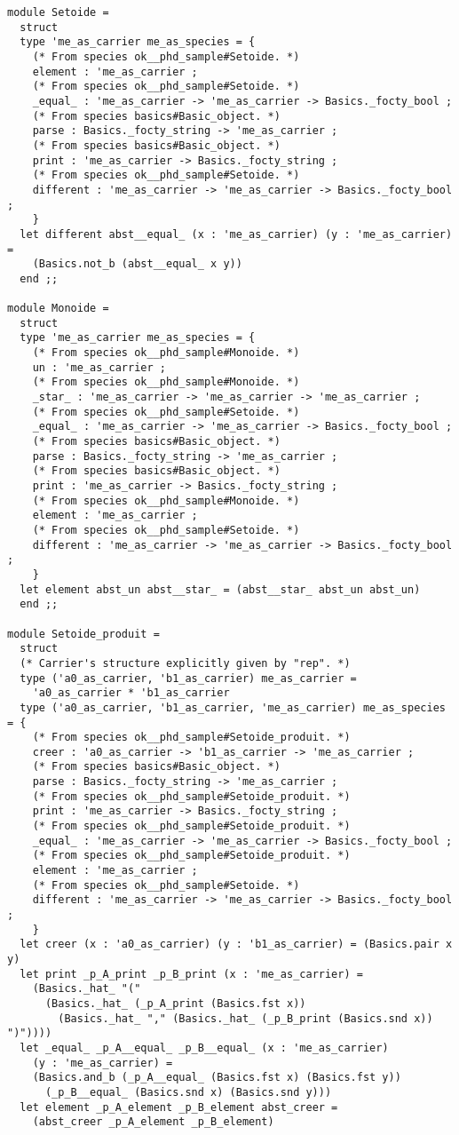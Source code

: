 {\footnotesize
\begin{lstlisting}[language=MyOCaml]
module Setoide =
  struct
  type 'me_as_carrier me_as_species = {
    (* From species ok__phd_sample#Setoide. *)
    element : 'me_as_carrier ;
    (* From species ok__phd_sample#Setoide. *)
    _equal_ : 'me_as_carrier -> 'me_as_carrier -> Basics._focty_bool ;
    (* From species basics#Basic_object. *)
    parse : Basics._focty_string -> 'me_as_carrier ;
    (* From species basics#Basic_object. *)
    print : 'me_as_carrier -> Basics._focty_string ;
    (* From species ok__phd_sample#Setoide. *)
    different : 'me_as_carrier -> 'me_as_carrier -> Basics._focty_bool ;
    }
  let different abst__equal_ (x : 'me_as_carrier) (y : 'me_as_carrier) =
    (Basics.not_b (abst__equal_ x y))
  end ;;

module Monoide =
  struct
  type 'me_as_carrier me_as_species = {
    (* From species ok__phd_sample#Monoide. *)
    un : 'me_as_carrier ;
    (* From species ok__phd_sample#Monoide. *)
    _star_ : 'me_as_carrier -> 'me_as_carrier -> 'me_as_carrier ;
    (* From species ok__phd_sample#Setoide. *)
    _equal_ : 'me_as_carrier -> 'me_as_carrier -> Basics._focty_bool ;
    (* From species basics#Basic_object. *)
    parse : Basics._focty_string -> 'me_as_carrier ;
    (* From species basics#Basic_object. *)
    print : 'me_as_carrier -> Basics._focty_string ;
    (* From species ok__phd_sample#Monoide. *)
    element : 'me_as_carrier ;
    (* From species ok__phd_sample#Setoide. *)
    different : 'me_as_carrier -> 'me_as_carrier -> Basics._focty_bool ;
    }
  let element abst_un abst__star_ = (abst__star_ abst_un abst_un)
  end ;;

module Setoide_produit =
  struct
  (* Carrier's structure explicitly given by "rep". *)
  type ('a0_as_carrier, 'b1_as_carrier) me_as_carrier =
    'a0_as_carrier * 'b1_as_carrier
  type ('a0_as_carrier, 'b1_as_carrier, 'me_as_carrier) me_as_species = {
    (* From species ok__phd_sample#Setoide_produit. *)
    creer : 'a0_as_carrier -> 'b1_as_carrier -> 'me_as_carrier ;
    (* From species basics#Basic_object. *)
    parse : Basics._focty_string -> 'me_as_carrier ;
    (* From species ok__phd_sample#Setoide_produit. *)
    print : 'me_as_carrier -> Basics._focty_string ;
    (* From species ok__phd_sample#Setoide_produit. *)
    _equal_ : 'me_as_carrier -> 'me_as_carrier -> Basics._focty_bool ;
    (* From species ok__phd_sample#Setoide_produit. *)
    element : 'me_as_carrier ;
    (* From species ok__phd_sample#Setoide. *)
    different : 'me_as_carrier -> 'me_as_carrier -> Basics._focty_bool ;
    }
  let creer (x : 'a0_as_carrier) (y : 'b1_as_carrier) = (Basics.pair x y)
  let print _p_A_print _p_B_print (x : 'me_as_carrier) =
    (Basics._hat_ "("
      (Basics._hat_ (_p_A_print (Basics.fst x))
        (Basics._hat_ "," (Basics._hat_ (_p_B_print (Basics.snd x)) ")"))))
  let _equal_ _p_A__equal_ _p_B__equal_ (x : 'me_as_carrier)
    (y : 'me_as_carrier) =
    (Basics.and_b (_p_A__equal_ (Basics.fst x) (Basics.fst y))
      (_p_B__equal_ (Basics.snd x) (Basics.snd y)))
  let element _p_A_element _p_B_element abst_creer =
    (abst_creer _p_A_element _p_B_element)


\end{lstlisting}}
